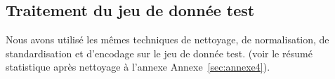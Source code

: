 \subsection{Traitement du jeu de donnée test}

Nous avons utilisé les mêmes techniques de nettoyage, de normalisation, de standardisation et d'encodage sur le jeu de donnée test. (voir le résumé statistique après nettoyage à l'annexe Annexe~\ref{sec:annexe4}). 

